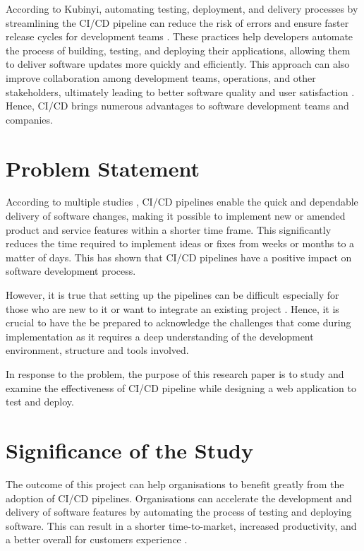 According to Kubinyi, automating testing, deployment, and delivery processes by streamlining the CI/CD pipeline can reduce the risk of errors and ensure faster release cycles for development teams \cite{kubinyi}. These practices help developers automate the process of building, testing, and deploying their applications, allowing them to deliver software updates more quickly and efficiently. This approach can also improve collaboration among development teams, operations, and other stakeholders, ultimately leading to better software quality and user satisfaction \cite{bs}. Hence, CI/CD brings numerous advantages to software development teams and companies.

\section{Problem Statement}
According to multiple studies \cite{sb, saarenpaa2020creating, saz, chen, dm, phillips2015manager}, CI/CD pipelines enable the quick and dependable delivery of software changes, making it possible to implement new or amended product and service features within a shorter time frame. This significantly reduces the time required to implement ideas or fixes from weeks or months to a matter of days. This has shown that CI/CD pipelines have a positive impact on software development process.

However, it is true that setting up the pipelines can be difficult especially for those who are new to it or want to integrate an existing project \cite{sander}. Hence, it is crucial to have the be prepared to acknowledge the challenges that come during implementation as it requires a deep understanding of the development environment, structure and tools involved.

In response to the problem, the purpose of this research paper is to study and examine the effectiveness of CI/CD pipeline while designing a web application to test and deploy.

\section{Significance of the Study}
The outcome of this project can help organisations to benefit greatly from the adoption of CI/CD pipelines. Organisations can accelerate the development and delivery of software features by automating the process of testing and deploying software. This can result in a shorter time-to-market, increased productivity, and a better overall for customers experience \cite{hf}.

